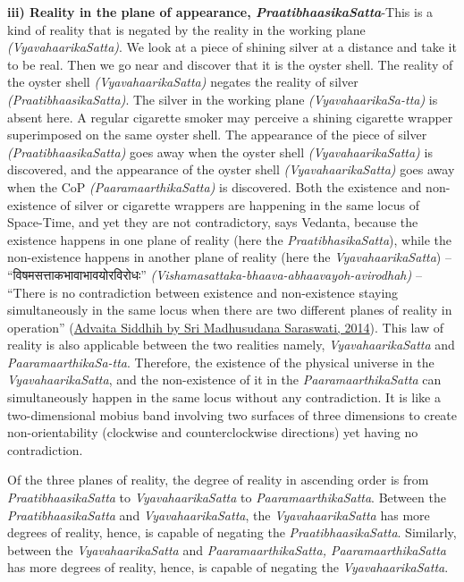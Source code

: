 \documentclass[twoside, 13pt]{article}
\begin{document}
{{\textbf{iii) Reality in the plane of appearance, \textit{PraatibhaasikaSatta}}-This is a kind of reality that is negated by the reality in the working plane \textit{(VyavahaarikaSatta)}. We look at a piece of shining silver at a distance and take it to be real. Then we go near and discover that it is the oyster shell. The reality of the oyster shell \textit{(VyavahaarikaSatta)} negates the reality of silver \textit{(PraatibhaasikaSatta)}. The silver in the working plane \textit{(VyavahaarikaSa-\break tta)} is absent here. A regular cigarette smoker may perceive a shining cigarette wrapper superimposed on the same oyster shell. The appearance of the piece of silver \textit{(PraatibhaasikaSatta)} goes away when the oyster shell \textit{(VyavahaarikaSatta)} is discovered, and the appearance of the oyster shell \textit{(VyavahaarikaSatta)} goes away when the CoP \textit{(PaaramaarthikaSatta)} is discovered. Both the existence and non-existence of silver or cigarette wrappers are happening in the same locus of Space-Time, and yet they are not contradictory, says Vedanta, because the existence happens in one plane of reality (here the \textit{PraatibhasikaSatta}), while the non-existence happens in another plane of reality (here the \textit{VyavahaarikaSatta}) – \foreignlanguage{hindi}{{\fontsize{9}{11}\selectfont “विषमसत्ताकभावाभावयोरविरोधः”}} \textit{(Vishamasattaka-bhaava-abhaavayoh-avirodhah)} – “There is no contradiction between existence and non-existence staying simultaneously in the same locus when there are two different planes of reality in operation” (\underline{Advaita Siddhih by Sri Madhusudana Saraswati, 2014}). This law of reality is also applicable between the two realities namely, \textit{VyavahaarikaSatta} and \textit{PaaramaarthikaSa-\break tta}. Therefore, the existence of the physical universe in the \textit{VyavahaarikaSatta}, and the non-existence of it in the \textit{PaaramaarthikaSatta} can simultaneously happen in the same locus without any contradiction. It is like a two-dimensional mobius band involving two surfaces of three dimensions to create non-orientability (clockwise and counterclockwise directions) yet having no contradiction. 

Of the three planes of reality, the degree of reality in ascending order is from \textit{PraatibhaasikaSatta} to \textit{VyavahaarikaSatta} to \textit{PaaramaarthikaSatta}. Between the \textit{Praatibhaasika\-Satta} and \textit{VyavahaarikaSatta}, the \textit{VyavahaarikaSatta} has more degrees of reality, hence, is capable of negating the \textit{PraatibhaasikaSatta}. Similarly, between the \textit{VyavahaarikaSatta} and \textit{PaaramaarthikaSatta, PaaramaarthikaSatta} has more degrees of reality, hence, is \break capable of negating the \textit{VyavahaarikaSatta}. 


}}
\end{document}
